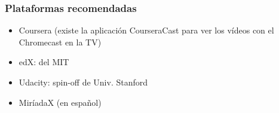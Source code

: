 
\begin{frame}
\frametitle{Plataformas recomendadas}

\begin{itemize}
   \item Coursera (existe la aplicación CourseraCast para ver los vídeos con el Chromecast en la TV)
   \item edX: del MIT
   \item Udacity: spin-off de Univ. Stanford
   \item MiríadaX (en español)
\end{itemize}

\end{frame}



